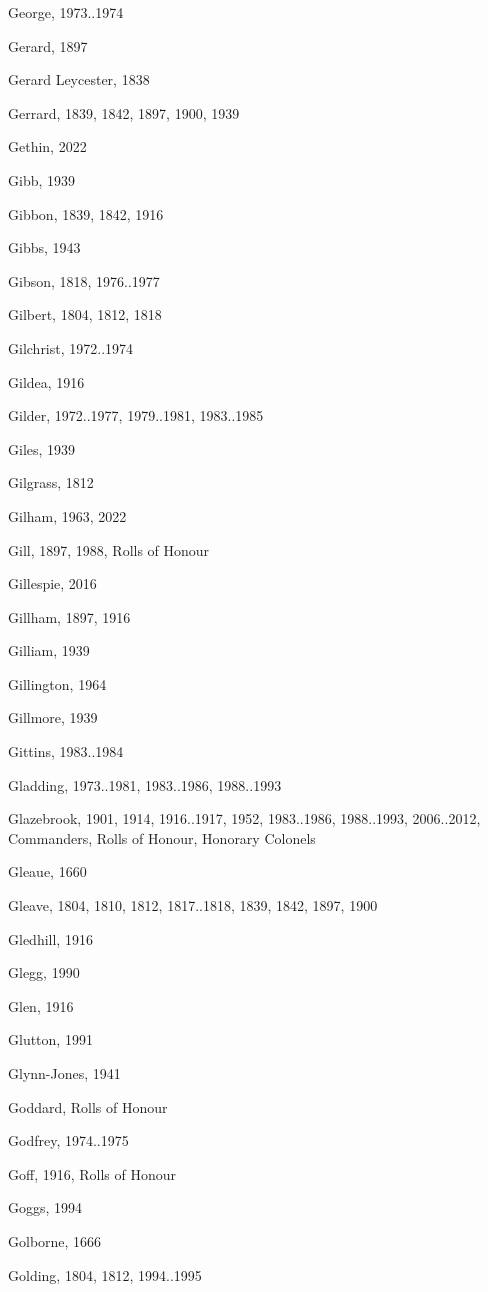 \begin{theindex}
\item George, 1973..1974
\item Gerard, 1897
\item Gerard Leycester, 1838
\item Gerrard, 1839, 1842, 1897, 1900, 1939
\item Gethin, 2022
\item Gibb, 1939
\item Gibbon, 1839, 1842, 1916
\item Gibbs, 1943
\item Gibson, 1818, 1976..1977
\item Gilbert, 1804, 1812, 1818
\item Gilchrist, 1972..1974
\item Gildea, 1916
\item Gilder, 1972..1977, 1979..1981, 1983..1985
\item Giles, 1939
\item Gilgrass, 1812
\item Gilham, 1963, 2022
\item Gill, 1897, 1988, Rolls of Honour
\item Gillespie, 2016
\item Gillham, 1897, 1916
\item Gilliam, 1939
\item Gillington, 1964
\item Gillmore, 1939
\item Gittins, 1983..1984
\item Gladding, 1973..1981, 1983..1986, 1988..1993
\item Glazebrook, 1901, 1914, 1916..1917, 1952, 1983..1986, 1988..1993, 2006..2012, Commanders, Rolls of Honour, Honorary Colonels
\item Gleaue, 1660
\item Gleave, 1804, 1810, 1812, 1817..1818, 1839, 1842, 1897, 1900
\item Gledhill, 1916
\item Glegg, 1990
\item Glen, 1916
\item Glutton, 1991
\item Glynn-Jones, 1941
\item Goddard, Rolls of Honour
\item Godfrey, 1974..1975
\item Goff, 1916, Rolls of Honour
\item Goggs, 1994
\item Golborne, 1666
\item Golding, 1804, 1812, 1994..1995

\end{theindex}

